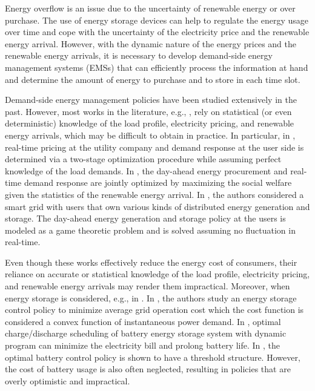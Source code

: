 Energy overflow is an issue due to the uncertainty of renewable energy or over purchase. The use of energy storage devices can help to regulate the energy usage over time and cope with the uncertainty of the electricity price and the renewable energy arrival. However, with the dynamic nature of the energy prices and the renewable energy arrivals, it is necessary to develop demand-side energy management systems (EMSs) \cite{smitha:2013,han:2014,lee:2014} that can efficiently process the information at hand and determine the amount of energy to purchase and to store in each time slot.

Demand-side energy management policies have been studied extensively in the past. However, most works in the literature, e.g., \cite{li:2013,jiang:2011,atzeni:2013}, rely on statistical (or even deterministic) knowledge of the load profile, electricity pricing, and renewable energy arrivals, which may be difficult to obtain in practice. In particular, in \cite{li:2013}, real-time pricing at the utility company and demand response at the user side is determined via a two-stage optimization procedure while assuming perfect knowledge of the load demands. In \cite{jiang:2011}, the day-ahead energy procurement and real-time demand response are jointly optimized by maximizing the social welfare given the statistics of the renewable energy arrival. In \cite{atzeni:2013}, the authors considered a smart grid with users that own various kinds of distributed energy generation and storage. The day-ahead energy generation and storage policy at the users is modeled as a game theoretic problem and is solved assuming no fluctuation in real-time.

Even though these works effectively reduce the energy cost of consumers, their reliance on accurate or statistical knowledge of the load profile, electricity pricing, and renewable energy arrivals may render them impractical. Moreover, when energy storage is considered, e.g., in \cite{koutsopoulos:2011,erseghe:2014,maly:1995,ven:2013}. In \cite{koutsopoulos:2011,erseghe:2014}, the authors study an energy storage control policy to minimize average grid operation cost which the cost function is considered a convex function of instantaneous power demand. In \cite{maly:1995}, optimal charge/discharge scheduling of battery energy storage system with dynamic program can minimize the electricity bill and prolong battery life. In \cite{ven:2013}, the optimal battery control policy is shown to have a threshold structure. However, the cost of battery usage is also often neglected, resulting in policies that are overly optimistic and impractical.

